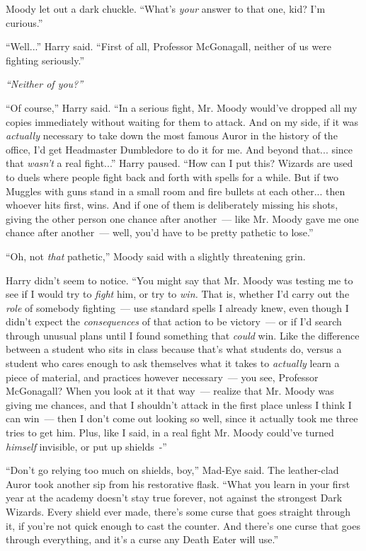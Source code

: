Moody let out a dark chuckle. ``What's \emph{your} answer to that one, kid? I'm curious.''

``Well...'' Harry said. ``First of all, Professor McGonagall, neither of us were fighting seriously.''

\emph{``Neither of you?''}

``Of course,'' Harry said. ``In a serious fight, Mr. Moody would've dropped all my copies immediately without waiting for them to attack. And on my side, if it was \emph{actually} necessary to take down the most famous Auror in the history of the office, I'd get Headmaster Dumbledore to do it for me. And beyond that... since that \emph{wasn't} a real fight...'' Harry paused. ``How can I put this? Wizards are used to duels where people fight back and forth with spells for a while. But if two Muggles with guns stand in a small room and fire bullets at each other... then whoever hits first, wins. And if one of them is deliberately missing his shots, giving the other person one chance after another~--- like Mr. Moody gave me one chance after another~--- well, you'd have to be pretty pathetic to lose.''

``Oh, not \emph{that} pathetic,'' Moody said with a slightly threatening grin.

Harry didn't seem to notice. ``You might say that Mr. Moody was testing me to see if I would try to \emph{fight} him, or try to \emph{win.} That is, whether I'd carry out the \emph{role} of somebody fighting~--- use standard spells I already knew, even though I didn't expect the \emph{consequences} of that action to be victory~--- or if I'd search through unusual plans until I found something that \emph{could} win. Like the difference between a student who sits in class because that's what students do, versus a student who cares enough to ask themselves what it takes to \emph{actually} learn a piece of material, and practices however necessary~--- you see, Professor McGonagall? When you look at it that way~--- realize that Mr. Moody was giving me chances, and that I shouldn't attack in the first place unless I think I can win~--- then I don't come out looking so well, since it actually took me three tries to get him. Plus, like I said, in a real fight Mr. Moody could've turned \emph{himself} invisible, or put up shields~-''

``Don't go relying too much on shields, boy,'' Mad-Eye said. The leather-clad Auror took another sip from his restorative flask. ``What you learn in your first year at the academy doesn't stay true forever, not against the strongest Dark Wizards. Every shield ever made, there's some curse that goes straight through it, if you're not quick enough to cast the counter. And there's one curse that goes through everything, and it's a curse any Death Eater will use.''

